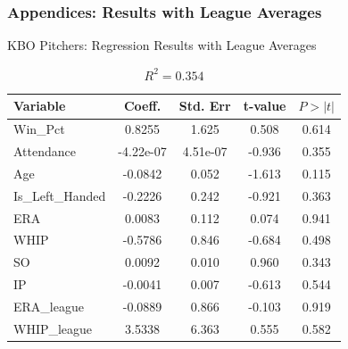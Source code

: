 \documentclass[9pt]{beamer}
\begin{document}
\begin{frame}
    \frametitle{Appendices: Results with League Averages} 
    \begin{block}{KBO Pitchers: Regression Results with League Averages}
        \begin{table}[ht]
            \centering
            \caption{$R^2 = 0.354$}
            \begin{tabular}{lcccc}
            \toprule
            Variable & Coeff. & Std. Err & t-value & $P > |t|$ \\
            \midrule
            Win\_Pct & 0.8255 & 1.625 & 0.508 & 0.614 \\
            Attendance & -4.22e-07 & 4.51e-07 & -0.936 & 0.355 \\
            Age & -0.0842 & 0.052 & -1.613 & 0.115 \\
            Is\_Left\_Handed & -0.2226 & 0.242 & -0.921 & 0.363 \\
            ERA & 0.0083 & 0.112 & 0.074 & 0.941 \\
            WHIP & -0.5786 & 0.846 & -0.684 & 0.498 \\
            SO & 0.0092 & 0.010 & 0.960 & 0.343 \\
            IP & -0.0041 & 0.007 & -0.613 & 0.544 \\
            ERA\_league & -0.0889 & 0.866 & -0.103 & 0.919 \\
            WHIP\_league & 3.5338 & 6.363 & 0.555 & 0.582 \\
            \bottomrule
            \end{tabular}
        \end{table}        
    \end{block}
\end{frame}
\end{document}
